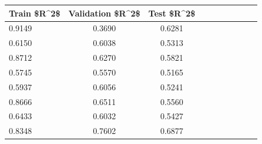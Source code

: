 \begin{tabular}{lccccccccc}
\toprule
Train \$R\textasciicircum 2\$ & Validation \$R\textasciicircum 2\$ & Test \$R\textasciicircum 2\$ \\
\midrule
0.9149 & 0.3690 & 0.6281 \\
0.6150 & 0.6038 & 0.5313 \\
0.8712 & 0.6270 & 0.5821 \\
0.5745 & 0.5570 & 0.5165 \\
0.5937 & 0.6056 & 0.5241 \\
0.8666 & 0.6511 & 0.5560 \\
0.6433 & 0.6032 & 0.5427 \\
0.8348 & 0.7602 & 0.6877 \\
\bottomrule
\end{tabular}
